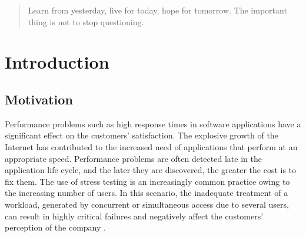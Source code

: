 \documentclass[espaco=umemeio,chapter=TITLE,twoside,openright]{abnt}
\begin{document}
\newcommand{\beleleu}{\textit{beleleu}}








\vspace*{\fill}
\begin{quote} 
\centering 
    Learn from yesterday, live for today, hope for tomorrow. The important thing is not to stop questioning. 
\end{quote}
\vspace*{\fill}








\tableofcontents

\listoffigures

\listoftables







%



\chapter{Introduction}

\section{Motivation}

Performance problems such as high response times in software applications have a significant effect on the customers’ satisfaction. The explosive growth of the Internet has contributed to the increased need of  applications that perform at an appropriate speed. Performance problems are often detected late in the application life cycle, and the later they are discovered, the greater the cost is to fix them. The use of stress testing is an increasingly common practice owing to the increasing number of users. In this scenario, the inadequate treatment of a workload,  generated by concurrent or simultaneous access due to several users, can result in highly critical failures and negatively affect the customers' perception of the company  \cite{Jiang2010} \cite{Molyneaux2009} \cite{Wert2014}.
\end{document}
